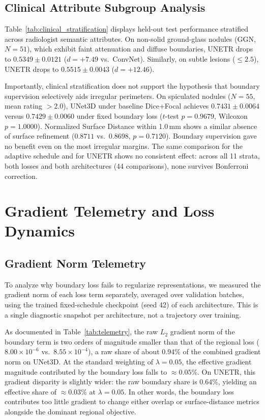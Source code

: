 \documentclass[10pt, a4paper, twocolumn]{article}
\begin{document}
\subsection{Clinical Attribute Subgroup Analysis}
Table~\ref{tab:clinical_stratification} displays held-out test performance stratified across radiologist semantic attributes. On non-solid ground-glass nodules (GGN, $N=51$), which exhibit faint attenuation and diffuse boundaries, UNETR drops to $0.5349 \pm 0.0121$ ($d = +7.49$ vs.\ ConvNet). Similarly, on subtle lesions ($\le 2.5$), UNETR drops to $0.5515 \pm 0.0043$ ($d = +12.46$).

Importantly, clinical stratification does not support the hypothesis that boundary supervision selectively aids irregular perimeters. On spiculated nodules ($N=55$, mean rating $>2.0$), UNet3D under baseline Dice+Focal achieves $0.7431 \pm 0.0064$ versus $0.7429 \pm 0.0060$ under fixed boundary loss ($t$-test $p = 0.9679$, Wilcoxon $p = 1.0000$). Normalized Surface Distance within 1.0\,mm shows a similar absence of surface refinement ($0.8711$ vs.\ $0.8698$, $p = 0.7120$). Boundary supervision gave no benefit even on the most irregular margins. The same comparison for the adaptive schedule and for UNETR shows no consistent effect: across all 11 strata, both losses and both architectures (44 comparisons), none survives Bonferroni correction.

\section{Gradient Telemetry and Loss Dynamics}

\subsection{Gradient Norm Telemetry}
To analyze why boundary loss fails to regularize representations, we measured the gradient norm of each loss term separately, averaged over validation batches, using the trained fixed-schedule checkpoint (seed 42) of each architecture. This is a single diagnostic snapshot per architecture, not a trajectory over training.

As documented in Table~\ref{tab:telemetry}, the raw $L_{2}$ gradient norm of the boundary term is two orders of magnitude smaller than that of the regional loss ($8.00\times10^{-6}$ vs.\ $8.55\times10^{-4}$), a raw share of about 0.94\% of the combined gradient norm on UNet3D. At the standard weighting of $\lambda=0.05$, the effective gradient magnitude contributed by the boundary loss falls to $\approx0.05\%$. On UNETR, this gradient disparity is slightly wider: the raw boundary share is 0.64\%, yielding an effective share of $\approx0.03\%$ at $\lambda=0.05$. In other words, the boundary loss contributes too little gradient to change either overlap or surface-distance metrics alongside the dominant regional objective.
\end{document}
